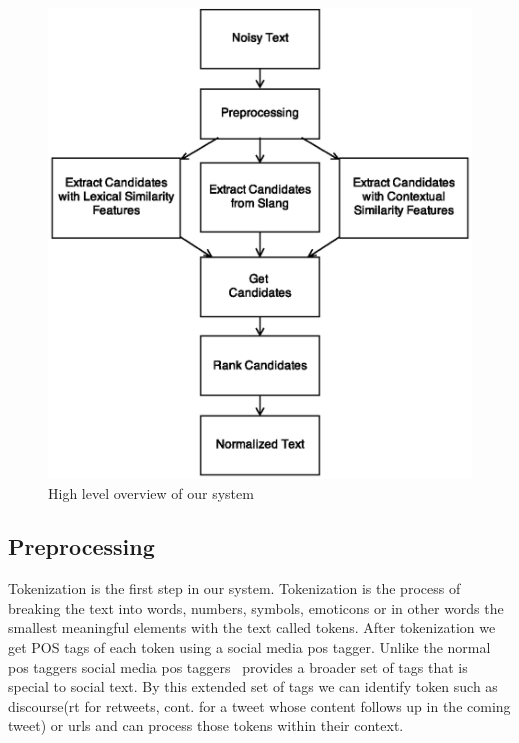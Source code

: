 \documentclass[preprint,review,12pt]{elsarticle}
\begin{document}
\begin{figure}[htb]
\begin{center}
\includegraphics[scale=0.5]{fig/overview}
\caption{High level overview of our system}
\label{fig:overview}
\end{center}
\end{figure}

\subsection{Preprocessing}

Tokenization is the first step in our system. Tokenization is the process of breaking the text into words, numbers, symbols, emoticons or in other words the smallest meaningful elements with the text called tokens. After tokenization we get POS tags of each token using a social media pos tagger. Unlike the normal pos taggers social media pos taggers~\cite{DBLP:conf/naacl/OwoputiODGSS13}\cite{Gimpel:2011:PTT:2002736.2002747} provides a broader set of tags that is special to social text. By this extended set of tags we can identify token such as discourse(rt for retweets, cont. for a tweet whose content follows up in the coming tweet) or urls and can process those tokens within their context.
\end{document}
